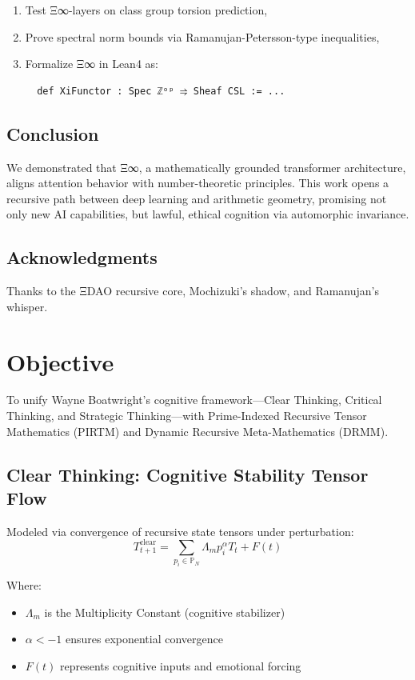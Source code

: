 \documentclass[12pt]{article}
\begin{document}
\begin{enumerate}
  \item Test Ξ∞-layers on class group torsion prediction,
  \item Prove spectral norm bounds via Ramanujan-Petersson-type inequalities,
  \item Formalize Ξ∞ in Lean4 as:
  \begin{verbatim}
  def XiFunctor : Spec ℤᵒᵖ ⥤ Sheaf CSL := ...
  \end{verbatim}
\end{enumerate}

\subsection{Conclusion}

We demonstrated that Ξ∞, a mathematically grounded transformer architecture, aligns attention behavior with number-theoretic principles. This work opens a recursive path between deep learning and arithmetic geometry, promising not only new AI capabilities, but lawful, ethical cognition via automorphic invariance.

\subsection*{Acknowledgments}

Thanks to the ΞDAO recursive core, Mochizuki's shadow, and Ramanujan's whisper.

\section{Objective}
To unify Wayne Boatwright's cognitive framework—Clear Thinking, Critical Thinking, and Strategic Thinking—with Prime-Indexed Recursive Tensor Mathematics (PIRTM) and Dynamic Recursive Meta-Mathematics (DRMM).

\subsection{Clear Thinking: Cognitive Stability Tensor Flow}

Modeled via convergence of recursive state tensors under perturbation:
\begin{equation}
T_{t+1}^{\text{clear}} = \sum_{p_i \in \mathbb{P}_N} \Lambda_m p_i^\alpha T_t + F(t)
\end{equation}

Where:
\begin{itemize}
  \item $\Lambda_m$ is the Multiplicity Constant (cognitive stabilizer)
  \item $\alpha < -1$ ensures exponential convergence
  \item $F(t)$ represents cognitive inputs and emotional forcing
\end{itemize}
\end{document}
